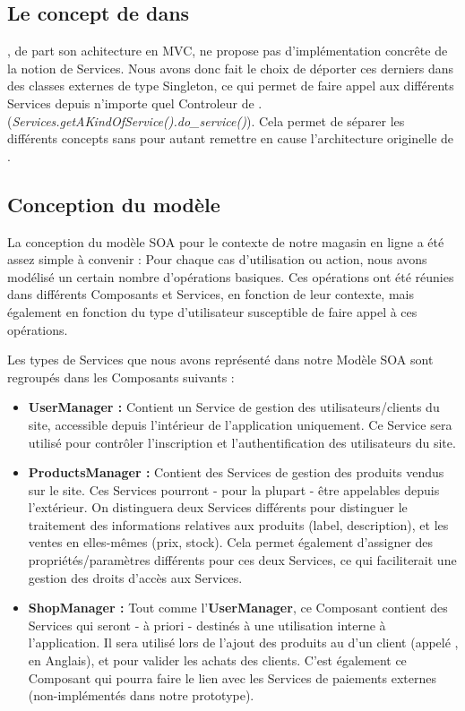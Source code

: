 \subsection{Le concept de \kwsoa{} dans \kwplay{}}

\kwplay{}, de part son achitecture en MVC, ne propose pas d'implémentation concrête de la notion de Services. 
Nous avons donc fait le choix de déporter ces derniers dans des classes externes de type Singleton, ce qui permet de faire appel aux différents Services depuis n'importe quel Controleur de \kwplay{}. (\textit{Services.getAKindOfService().do\_service()}). 
Cela permet de séparer les différents concepts sans pour autant remettre en cause l'architecture originelle de \kwplay{}.

\subsection{Conception du modèle}

La conception du modèle SOA pour le contexte de notre magasin en ligne a été assez simple à convenir : Pour chaque cas d'utilisation ou action, nous avons modélisé un certain nombre d'opérations basiques. Ces opérations ont été réunies dans différents Composants et Services, en fonction de leur contexte, mais également en fonction du type d'utilisateur susceptible de faire appel à ces opérations.


Les types de Services que nous avons représenté dans notre Modèle SOA sont regroupés dans les Composants suivants :
\begin{itemize}
\item \textbf{UserManager :} Contient un Service de gestion des utilisateurs/clients du site, accessible depuis l'intérieur de l'application uniquement. Ce Service sera utilisé pour contrôler l'inscription et l'authentification des utilisateurs du site.
\item \textbf{ProductsManager :} Contient des Services de gestion des produits vendus sur le site. Ces Services pourront - pour la plupart - être appelables depuis l'extérieur. On distinguera deux Services différents pour distinguer le traitement des informations relatives aux produits (label, description), et les ventes en elles-mêmes (prix, stock). Cela permet également d'assigner des propriétés/paramètres différents pour ces deux Services, ce qui faciliterait une gestion des droits d'accès aux Services.
\item \textbf{ShopManager :} Tout comme l'\textbf{UserManager}, ce Composant contient des Services qui seront - à priori - destinés à une utilisation interne à l'application. Il sera utilisé lors de l'ajout des produits au  d'un client (appelé , en Anglais), et pour valider les achats des clients. C'est également ce Composant qui pourra faire le lien avec les Services de paiements externes (non-implémentés dans notre prototype).
\end{itemize}

